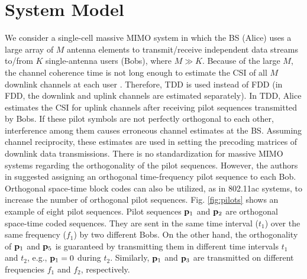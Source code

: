 \documentclass[draftclsnofoot, 12pt, onecolumn, journal]{IEEEtran}
\newcommand{\pv}{{\bf p}}
\begin{document}
\section{System Model}
\label{sec:systemodel}

We consider a single-cell massive MIMO system in which the BS (Alice) uses a large array of $M$ antenna elements to transmit/receive independent data streams to/from $K$ single-antenna users (Bobs), where $M \gg K$.
Because of the large $M$, the channel coherence time is not long enough to estimate the CSI of all $M$ downlink channels at each user \cite{Lu2014}.
Therefore, TDD is used instead of FDD (in FDD, the downlink and uplink channels are estimated separately).
In TDD, Alice estimates the CSI for uplink channels after receiving pilot sequences transmitted by Bobs.
If these pilot symbols are not perfectly orthogonal to each other, interference among them causes erroneous channel estimates at the BS.
Assuming channel reciprocity, these estimates are used in setting the precoding matrices of downlink data transmissions.
There is no standardization for massive MIMO systems regarding the orthogonality of the pilot sequences.
However, the authors in \cite{Marzetta2010} suggested assigning an orthogonal time-frequency pilot sequence to each Bob.
Orthogonal space-time block codes can also be utilized, as in 802.11ac systems, to increase the number of orthogonal pilot sequences.
Fig. \ref{fig:pilots} shows an example of eight pilot sequences.
Pilot sequences $\pv_1$ and $\pv_2$ are orthogonal space-time coded sequences.
They are sent in the same time interval ($t_1$) over the same frequency ($f_1$) by two different Bobs.
On the other hand, the orthogonality of $\pv_1$ and $\pv_5$ is guaranteed by transmitting them in different time intervals $t_1$ and $t_2$, e.g., $\pv_1 = 0$ during $t_2$.
Similarly, $\pv_1$ and $\pv_3$ are transmitted on different frequencies $f_1$ and $f_2$, respectively.
\end{document}
